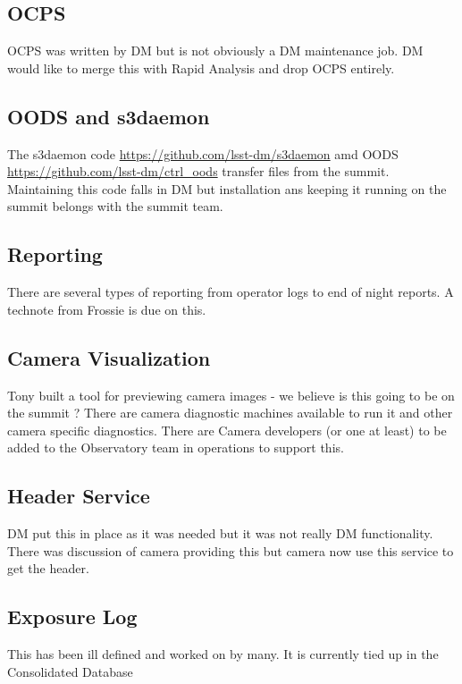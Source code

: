 \subsection{ \gls{OCPS} }
\gls{OCPS}   was  written by \gls{DM} but is  not obviously a \gls{DM} maintenance job.
DM would like to merge this with Rapid Analysis and drop OCPS entirely.

\subsection{ OODS and s3daemon }
The s3daemon code \url{https://github.com/lsst-dm/s3daemon} amd OODS \url{https://github.com/lsst-dm/ctrl_oods}
transfer files from the summit.
Maintaining this code  falls in DM but installation ans keeping it running on the summit belongs with the summit team.

\subsection{ Reporting }

There are several types of reporting from operator logs to end of night reports.
A technote from Frossie is due on this.

\subsection{ \gls{Camera} Visualization}
Tony built a tool for previewing camera images - we believe is this going to be on the summit ?
There are camera diagnostic machines available to run it and other camera specific diagnostics.
There are Camera developers (or one at least) to be added to the Observatory team in operations to support this.


\subsection{ Header Service }
 \gls{DM} put this in place as it was  needed but it was not really \gls{DM} functionality.
There was discussion of camera providing this but camera now use this service to get the header.

\subsection{ Exposure Log}
This has been ill defined and worked on by many.
It is currently tied up in the Consolidated Database 

